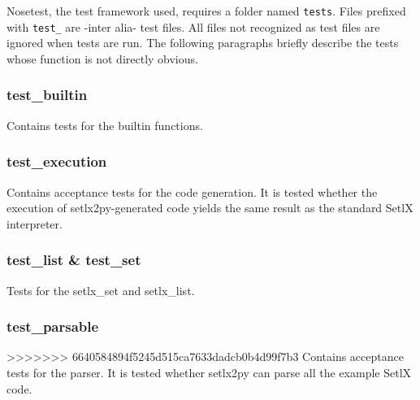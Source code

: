 Nosetest, the test framework used, requires a folder named \texttt{tests}. Files prefixed with \texttt{test\_} are -inter alia- test files. All files not recognized as test files are ignored when tests are run. The following paragraphs briefly describe the tests whose function is not directly obvious.

%
\subsubsection{test\_builtin}

Contains tests for the builtin functions.

%
\subsubsection{test\_execution}

Contains acceptance tests for the code generation. It is tested whether the execution of setlx2py-generated code yields the same result as the standard SetlX interpreter.
%
\subsubsection{test\_list \& test\_set}

Tests for the setlx\_set and setlx_list.

%
\subsubsection{test\_parsable}

>>>>>>> 6640584894f5245d515ca7633dadcb0b4d99f7b3
Contains acceptance tests for the parser. It is tested whether setlx2py can parse all the example SetlX code.